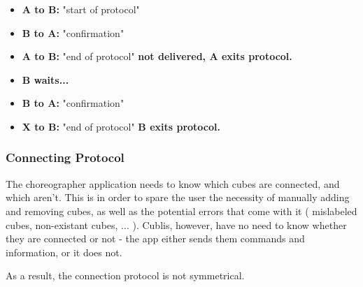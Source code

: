 \begin{itemize}
\item[] \textbf{A to B:} "start of protocol"
\item[] \textbf{B to A:} "confirmation"
\item[] \textbf{A to B:} "end of protocol" \textbf{not delivered, A exits protocol.}
\item[] \textbf{B waits...}
\item[] \textbf{B to A:} "confirmation"
\item[] \textbf{X to B:} "end of protocol"  \textbf{B exits protocol.}
\end{itemize}


\subsubsection{Connecting Protocol}

The choreographer application needs to know which cubes are connected, and which aren't. This is in order to spare the user the necessity of manually adding and removing cubes, as well as the potential errors that come with it ( mislabeled cubes, non-existant cubes, ... ). Cublis, however, have no need to know whether they are connected or not - the app either sends them commands and information, or it does not.

As a result, the connection protocol is not symmetrical. 

